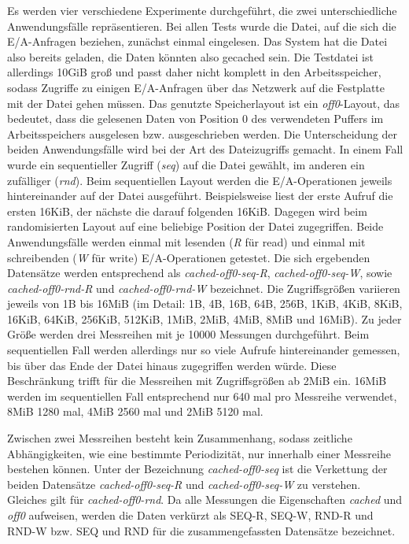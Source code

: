 \documentclass[
	12pt,
	a4paper,
	BCOR10mm,
	DIV14,
	listof=totoc,
	bibliography=totoc,
	headsepline
]{scrreprt}
\begin{document}
Es werden vier verschiedene Experimente durchgeführt, die zwei unterschiedliche Anwendungsfälle repräsentieren.
Bei allen Tests wurde die Datei, auf die sich die E/A-Anfragen beziehen, zunächst einmal eingelesen. Das System hat die Datei also bereits geladen, die Daten könnten also gecached sein.
Die Testdatei ist allerdings 10GiB groß und passt daher nicht komplett in den Arbeitsspeicher, sodass Zugriffe zu einigen E/A-Anfragen über das Netzwerk auf die Festplatte mit der Datei gehen müssen.
Das genutzte Speicherlayout ist ein \textit{off0}-Layout, das bedeutet, dass die gelesenen Daten von Position 0 des verwendeten Puffers im Arbeitsspeichers ausgelesen bzw. ausgeschrieben werden.
Die Unterscheidung der beiden Anwendungsfälle wird bei der Art des Dateizugriffs gemacht.
In einem Fall wurde ein sequentieller Zugriff (\textit{seq}) auf die Datei gewählt, im anderen ein zufälliger (\textit{rnd}).
Beim sequentiellen Layout werden die E/A-Operationen jeweils hintereinander auf der Datei ausgeführt. Beispielsweise liest der erste Aufruf die ersten 16KiB, der nächste die darauf folgenden 16KiB.
Dagegen wird beim randomisierten Layout auf eine beliebige Position der Datei zugegriffen.
Beide Anwendungsfälle werden einmal mit lesenden (\textit{R} für read) und einmal mit schreibenden (\textit{W} für write) E/A-Operationen getestet.
Die sich ergebenden Datensätze werden entsprechend als \textit{cached-off0-seq-R}, \textit{cached-off0-seq-W}, sowie \textit{cached-off0-rnd-R} und \textit{cached-off0-rnd-W} bezeichnet.
Die Zugriffsgrößen variieren jeweils von 1B bis 16MiB (im Detail: 1B, 4B, 16B, 64B, 256B, 1KiB, 4KiB, 8KiB, 16KiB, 64KiB, 256KiB, 512KiB, 1MiB, 2MiB, 4MiB, 8MiB und 16MiB).
Zu jeder Größe werden drei Messreihen mit je 10000 Messungen durchgeführt.
Beim sequentiellen Fall werden allerdings nur so viele Aufrufe hintereinander gemessen, bis über das Ende der Datei hinaus zugegriffen werden würde.
Diese Beschränkung trifft für die Messreihen mit Zugriffsgrößen ab 2MiB ein. 16MiB werden im sequentiellen Fall entsprechend nur 640 mal pro Messreihe verwendet, 8MiB 1280 mal, 4MiB 2560 mal und 2MiB 5120 mal.\medskip

Zwischen zwei Messreihen besteht kein Zusammenhang, sodass zeitliche Abhängigkeiten, wie eine bestimmte Periodizität, nur innerhalb einer Messreihe bestehen können.  
Unter der Bezeichnung \textit{cached-off0-seq} ist die Verkettung der beiden Datensätze \textit{cached-off0-seq-R} und \textit{cached-off0-seq-W} zu verstehen. Gleiches gilt für \textit{cached-off0-rnd}.
Da alle Messungen die Eigenschaften \textit{cached} und \textit{off0} aufweisen, werden die Daten verkürzt als SEQ-R, SEQ-W, RND-R und RND-W bzw. SEQ und RND für die zusammengefassten Datensätze bezeichnet. 
\end{document}
